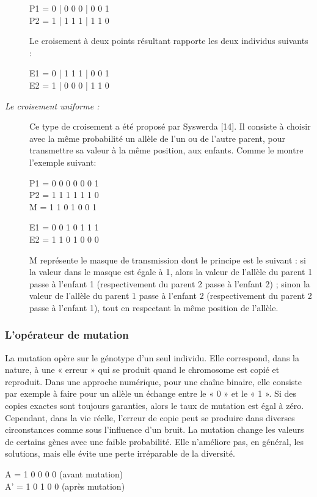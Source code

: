 \documentclass[12pt,a4paper]{article}
\begin{document}
\begin{description}
	\begin{center}
		P1 = 0 | 0 0 0 | 0 0 1 \\
		P2 = 1 | 1 1 1 | 1 1 0
	\end{center}
	
	Le croisement à deux points résultant rapporte les deux individus suivants :
	\begin{center}
		E1 = 0 | 1 1 1 | 0 0 1 \\
		E2 = 1 | 0 0 0 | 1 1 0
	\end{center}
	
		\item[\textsl{Le croisement uniforme :}]Ce type de croisement a été proposé par Syswerda [14]. Il consiste à choisir avec la même probabilité un allèle de l’un ou de l’autre parent, pour transmettre sa valeur à la même position, aux enfants. Comme le montre l'exemple suivant:
	\begin{center}
		P1 = 0 0 0 0 0 0 1 \\
		P2 = 1 1 1 1 1 1 0 \\
		M = 1 1 0 1 0 0 1
	\end{center}
	
	\begin{center}
		E1 = 0 0 1 0 1 1 1 \\
		E2 = 1 1 0 1 0 0 0
	\end{center}
	
	M représente le masque de transmission dont le principe est le suivant : si la valeur dans le masque est égale à 1, alors la valeur de l’allèle du parent 1 passe à l’enfant 1 (respectivement du parent 2 passe à l’enfant 2) ; sinon la valeur de l’allèle du parent 1 passe à l’enfant 2 (respectivement du parent 2 passe à l’enfant 1), tout en respectant la même position de l’allèle.
	\end{description}
	
	\subsubsection{L'opérateur de mutation}
	
	La mutation opère sur le génotype d’un seul individu. Elle correspond, dans la nature, à une « erreur » qui se produit quand le chromosome est copié et reproduit. Dans une approche numérique, pour une chaîne binaire, elle consiste par exemple à faire pour un allèle un échange entre le « 0 » et le « 1 ». Si des copies exactes sont toujours garanties, alors le taux de mutation est égal à zéro. Cependant, dans la vie réelle, l’erreur de copie peut se produire dans diverses circonstances comme sous l’influence d’un bruit. La mutation change les valeurs de certains gènes avec une faible probabilité. Elle n’améliore pas, en général, les solutions, mais elle évite une perte irréparable de la diversité.
	\begin{center}
		A = 1 0 0 0 0 (avant mutation) \\
		A' = 1 0 1 0 0 (après mutation)
	\end{center}
	
\end{document}
